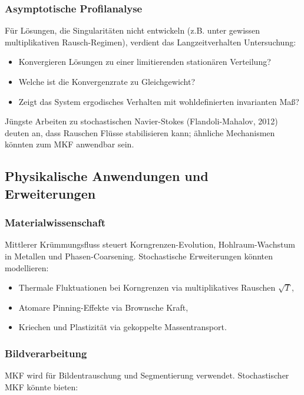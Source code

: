 \documentclass[a4paper,12pt]{article}
\theoremstyle{definition}
\begin{document}
\subsubsection{Asymptotische Profilanalyse}

Für Lösungen, die Singularitäten nicht entwickeln (z.B. unter gewissen multiplikativen Rausch-Regimen), verdient das Langzeitverhalten Untersuchung:

\begin{itemize}
	\item Konvergieren Lösungen zu einer limitierenden stationären Verteilung?
	\item Welche ist die Konvergenzrate zu Gleichgewicht?
	\item Zeigt das System ergodisches Verhalten mit wohldefinierten invarianten Maß?
\end{itemize}

Jüngste Arbeiten zu stochastischen Navier-Stokes (Flandoli-Mahalov, 2012) deuten an, dass Rauschen Flüsse stabilisieren kann; ähnliche Mechanismen könnten zum MKF anwendbar sein.

\subsection{Physikalische Anwendungen und Erweiterungen}

\subsubsection{Materialwissenschaft}

Mittlerer Krümmungsfluss steuert Korngrenzen-Evolution, Hohlraum-Wachstum in Metallen und Phasen-Coarsening. Stochastische Erweiterungen könnten modellieren:

\begin{itemize}
	\item Thermale Fluktuationen bei Korngrenzen via multiplikatives Rauschen $\sqrt{T}$,
	\item Atomare Pinning-Effekte via Brownsche Kraft,
	\item Kriechen und Plastizität via gekoppelte Massentransport.
\end{itemize}

\subsubsection{Bildverarbeitung}

MKF wird für Bildentrauschung und Segmentierung verwendet. Stochastischer MKF könnte bieten:
\end{document}
